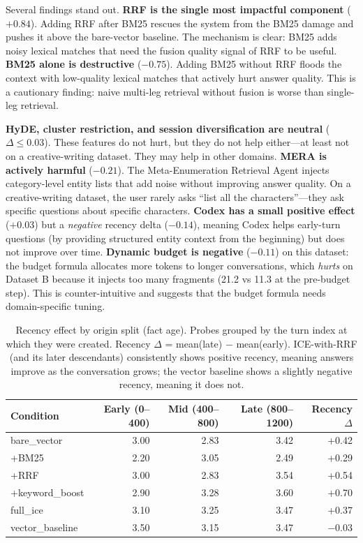 \documentclass[11pt,a4paper]{article}
\begin{document}
Several findings stand out. \textbf{RRF is the single most impactful component} ($+0.84$). Adding RRF after BM25 rescues the system from the BM25 damage and pushes it above the bare-vector baseline. The mechanism is clear: BM25 adds noisy lexical matches that need the fusion quality signal of RRF to be useful. \textbf{BM25 alone is destructive} ($-0.75$). Adding BM25 without RRF floods the context with low-quality lexical matches that actively hurt answer quality. This is a cautionary finding: naive multi-leg retrieval without fusion is worse than single-leg retrieval.

\textbf{HyDE, cluster restriction, and session diversification are neutral} ($\Delta \leq 0.03$). These features do not hurt, but they do not help either---at least not on a creative-writing dataset. They may help in other domains. \textbf{MERA is actively harmful} ($-0.21$). The Meta-Enumeration Retrieval Agent injects category-level entity lists that add noise without improving answer quality. On a creative-writing dataset, the user rarely asks ``list all the characters''---they ask specific questions about specific characters. \textbf{Codex has a small positive effect} ($+0.03$) but a \emph{negative} recency delta ($-0.14$), meaning Codex helps early-turn questions (by providing structured entity context from the beginning) but does not improve over time. \textbf{Dynamic budget is negative} ($-0.11$) on this dataset: the budget formula allocates more tokens to longer conversations, which \emph{hurts} on Dataset B because it injects too many fragments (21.2 vs 11.3 at the pre-budget step). This is counter-intuitive and suggests that the budget formula needs domain-specific tuning.

\begin{table}[htbp]
\centering
\small
\caption{Recency effect by origin split (fact age). Probes grouped by the turn index at which they were created. Recency $\Delta$ = mean(late) $-$ mean(early). ICE-with-RRF (and its later descendants) consistently shows positive recency, meaning answers improve as the conversation grows; the vector baseline shows a slightly negative recency, meaning it does not.}
\label{tab:ablation-recency}
\begin{tabular}{lrrrr}
\toprule
\textbf{Condition} & \textbf{Early (0--400)} & \textbf{Mid (400--800)} & \textbf{Late (800--1200)} & \textbf{Recency $\Delta$} \\
\midrule
bare\_vector       & 3.00 & 2.83 & 3.42 & +0.42 \\
+BM25              & 2.20 & 3.05 & 2.49 & +0.29 \\
+RRF               & 3.00 & 2.83 & 3.54 & +0.54 \\
+keyword\_boost    & 2.90 & 3.28 & 3.60 & +0.70 \\
full\_ice          & 3.10 & 3.25 & 3.47 & +0.37 \\
vector\_baseline   & 3.50 & 3.15 & 3.47 & $-0.03$ \\
\bottomrule
\end{tabular}
\end{table}
\end{document}
